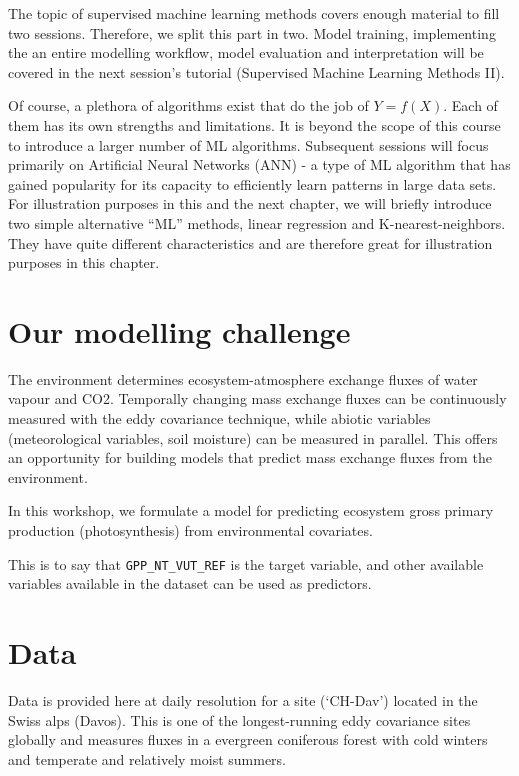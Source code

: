 \documentclass[
]{book}
\begin{document}
The topic of supervised machine learning methods covers enough material to fill two sessions. Therefore, we split this part in two. Model training, implementing the an entire modelling workflow, model evaluation and interpretation will be covered in the next session's tutorial (Supervised Machine Learning Methods II).

Of course, a plethora of algorithms exist that do the job of \(Y = f(X)\). Each of them has its own strengths and limitations. It is beyond the scope of this course to introduce a larger number of ML algorithms. Subsequent sessions will focus primarily on Artificial Neural Networks (ANN) - a type of ML algorithm that has gained popularity for its capacity to efficiently learn patterns in large data sets. For illustration purposes in this and the next chapter, we will briefly introduce two simple alternative ``ML'' methods, linear regression and K-nearest-neighbors. They have quite different characteristics and are therefore great for illustration purposes in this chapter.

\hypertarget{our-modelling-challenge}{%
\section{Our modelling challenge}\label{our-modelling-challenge}}

The environment determines ecosystem-atmosphere exchange fluxes of water vapour and CO2. Temporally changing mass exchange fluxes can be continuously measured with the eddy covariance technique, while abiotic variables (meteorological variables, soil moisture) can be measured in parallel. This offers an opportunity for building models that predict mass exchange fluxes from the environment.

In this workshop, we formulate a model for predicting ecosystem gross primary production (photosynthesis) from environmental covariates.

This is to say that \texttt{GPP\_NT\_VUT\_REF} is the target variable, and other available variables available in the dataset can be used as predictors.

\hypertarget{data}{%
\section{Data}\label{data}}

Data is provided here at daily resolution for a site (`CH-Dav') located in the Swiss alps (Davos). This is one of the longest-running eddy covariance sites globally and measures fluxes in a evergreen coniferous forest with cold winters and temperate and relatively moist summers.
\end{document}
